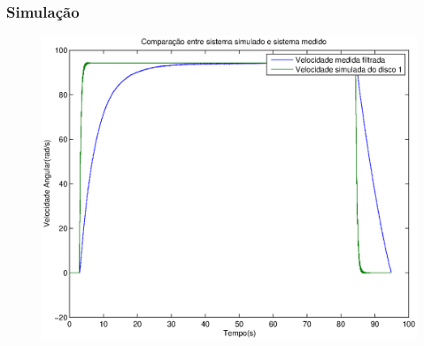 \documentclass{beamer}
\begin{document}
\begin{frame}
\frametitle{Simulação}
\begin{figure}
	\centering
	\includegraphics[width=0.7\linewidth]{simv}
\end{figure}
\end{frame}

\end{document}

